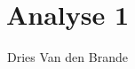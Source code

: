 \usepackage[dutch]{babel}
\usepackage{amsmath}
\usepackage{amssymb}

\title{Analyse 1}
\author{Dries Van den Brande}